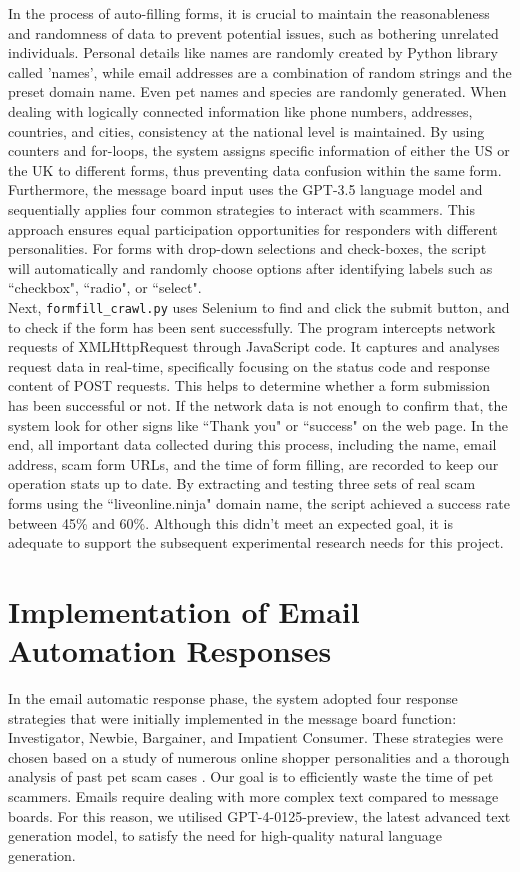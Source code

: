 \documentclass[ oneside,%
                    author={Cassie Qing Tang},
                    degree={BSc},
                     title={An Automated Response System for Disrupting Online Pet Scamming \\ },
                    subtitle={ }]{dissertation}
\begin{document}
In the process of auto-filling forms, it is crucial to maintain the reasonableness and randomness of data to prevent potential issues, such as bothering unrelated individuals. Personal details like names are randomly created by Python library called 'names', while email addresses are a combination of random strings and the preset domain name. Even pet names and species are randomly generated. When dealing with logically connected information like phone numbers, addresses, countries, and cities, consistency at the national level is maintained. By using counters and for-loops, the system assigns specific information of either the US or the UK to different forms, thus preventing data confusion within the same form. Furthermore, the message board input uses the GPT-3.5 language model and sequentially applies four common strategies to interact with scammers. This approach ensures equal participation opportunities for responders with different personalities. For forms with drop-down selections and check-boxes, the script will automatically and randomly choose options after identifying labels such as ``checkbox", ``radio", or ``select".
\\

Next, \texttt{formfill\_crawl.py} uses Selenium to find and click the submit button, and to check if the form has been sent successfully. The program intercepts network requests of XMLHttpRequest through JavaScript code. It captures and analyses request data in real-time, specifically focusing on the status code and response content of POST requests. This helps to determine whether a form submission has been successful or not. If the network data is not enough to confirm that, the system look for other signs like ``Thank you" or ``success" on the web page. In the end, all important data collected during this process, including the name, email address, scam form URLs, and the time of form filling, are recorded to keep our operation stats up to date. By extracting and testing three sets of real scam forms using the ``liveonline.ninja" domain name, the script achieved a success rate between 45\% and 60\%. Although this didn't meet an expected goal, it is adequate to support the subsequent experimental research needs for this project.


\section{Implementation of Email Automation Responses}
In the email automatic response phase, the system adopted four response strategies that were initially implemented in the message board function: Investigator, Newbie, Bargainer, and Impatient Consumer. These strategies were chosen based on a study of numerous online shopper personalities \cite{noauthor_types_nodate} and a thorough analysis of past pet scam cases \cite{whittaker_understanding_2020}. Our goal is to efficiently waste the time of pet scammers. Emails require dealing with more complex text compared to message boards. For this reason, we utilised GPT-4-0125-preview, the latest advanced text generation model, to satisfy the need for high-quality natural language generation.
\\
\end{document}
